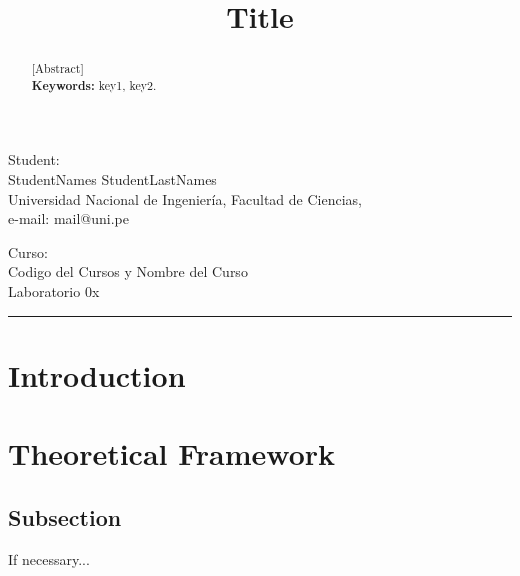 \documentclass[10pt,a4paper]{article}
\theoremstyle{definition}
\begin{document}
	
\title{Title}
\date{}
\maketitle

\begin{center}
	Student:\\
	\vspace{5pt}
	{\large StudentNames StudentLastNames}\\
	Universidad Nacional de Ingenier\'ia, Facultad de Ciencias,\\
	e-mail: mail@uni.pe
	
\end{center}
\vspace{5pt}
\begin{center}
	Curso:\\
	\vspace{5pt}
	{\large Codigo del Cursos y Nombre del Curso}\\
	{\large Laboratorio 0x}\\
	

	
\end{center}
\vspace{20pt}
\begin{abstract}
{\small
\hspace*{0.5cm}

[Abstract]\\

\textbf{Keywords:} key1, key2.
}
\end{abstract}




\tableofcontents

\vspace{20pt}
\hrule
\vspace{10pt}

\section{Introduction}

\section{Theoretical Framework}

\subsection{Subsection}
If necessary...
\end{document}

